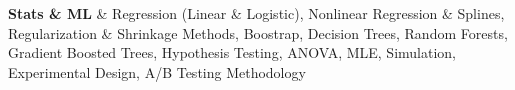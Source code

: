 \textbf{Stats \& ML} & 
Regression (Linear \& Logistic), 
Nonlinear Regression \& Splines, 
Regularization \& Shrinkage Methods, 
Boostrap, 
Decision Trees, 
Random Forests, 
Gradient Boosted Trees, 
Hypothesis Testing, 
ANOVA, 
MLE, 
Simulation, 
Experimental Design, 
A/B Testing Methodology